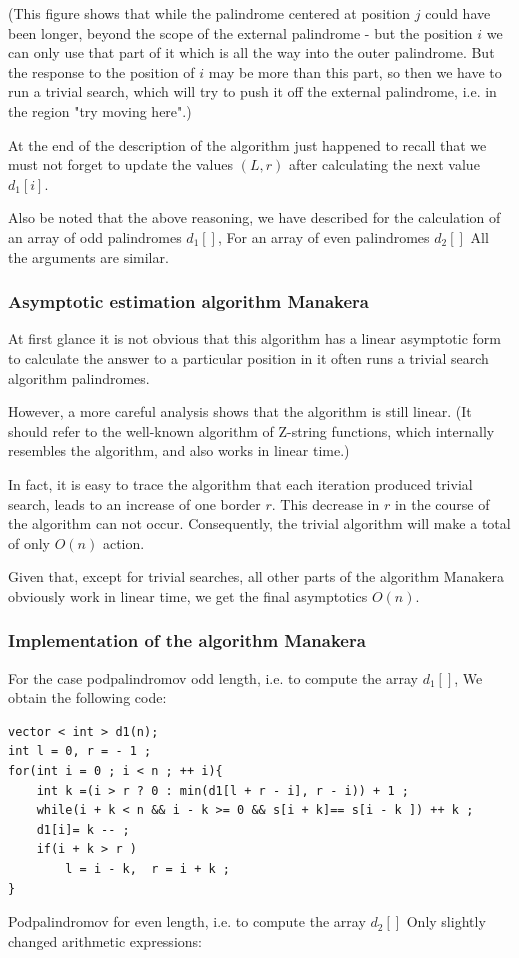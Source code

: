 (This figure shows that while the palindrome centered at position $j$ could have been longer, beyond the scope of the external palindrome - but the position $i$ we can only use that part of it which is all the way into the outer palindrome. But the response to the position of $i$ may be more than this part, so then we have to run a trivial search, which will try to push it off the external palindrome, i.e. in the region "try moving here".)

At the end of the description of the algorithm just happened to recall that we must not forget to update the values $(L, r)$ after calculating the next value $d_1 [i]$.

Also be noted that the above reasoning, we have described for the calculation of an array of odd palindromes $d_1 []$, For an array of even palindromes $d_2 []$ All the arguments are similar.

\subsubsection{ Asymptotic estimation algorithm Manakera }

At first glance it is not obvious that this algorithm has a linear asymptotic form to calculate the answer to a particular position in it often runs a trivial search algorithm palindromes.

However, a more careful analysis shows that the algorithm is still linear. (It should refer to the well-known algorithm of Z-string functions, which internally resembles the algorithm, and also works in linear time.)

In fact, it is easy to trace the algorithm that each iteration produced trivial search, leads to an increase of one border $r$. This decrease in $r$ in the course of the algorithm can not occur. Consequently, the trivial algorithm will make a total of only $O (n)$ action.

Given that, except for trivial searches, all other parts of the algorithm Manakera obviously work in linear time, we get the final asymptotics $O (n)$.

\subsubsection{ Implementation of the algorithm Manakera }

For the case podpalindromov odd length, i.e. to compute the array $d_1 []$, We obtain the following code:

\begin{verbatim}
vector < int > d1(n);
int l = 0, r = - 1 ;
for(int i = 0 ; i < n ; ++ i){
    int k =(i > r ? 0 : min(d1[l + r - i], r - i)) + 1 ;
    while(i + k < n && i - k >= 0 && s[i + k]== s[i - k ]) ++ k ;
    d1[i]= k -- ;
    if(i + k > r )
        l = i - k,  r = i + k ;
} 
\end{verbatim}
Podpalindromov for even length, i.e. to compute the array $d_2 []$ Only slightly changed arithmetic expressions:

